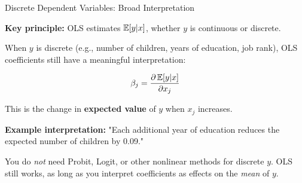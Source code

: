 \documentclass[aspectratio=169, 12pt]{beamer}
\begin{document}
\begin{frame}[shrink=20]{Discrete Dependent Variables: Broad Interpretation}

  \textbf{Key principle:} OLS estimates $\operatorname{\mathbb{E}}[y | x]$, whether $y$ is continuous or discrete.

  \medskip

  \begin{highlightbox}
    When $y$ is discrete (e.g., number of children, years of education, job rank), OLS coefficients still have a meaningful interpretation:

    \[
      \beta_j = \frac{\partial \operatorname{\mathbb{E}}[y | x]}{\partial x_j}
    \]

    This is the change in \textbf{expected value} of $y$ when $x_j$ increases.
  \end{highlightbox}

  \medskip

  \textbf{Example interpretation:} "Each additional year of education reduces the expected number of children by 0.09."

  \medskip

  \begin{keybox}
    You do \textit{not} need Probit, Logit, or other nonlinear methods for discrete $y$.
    OLS still works, as long as you interpret coefficients as effects on the \textit{mean} of $y$.
  \end{keybox}

\end{frame}
\end{document}
